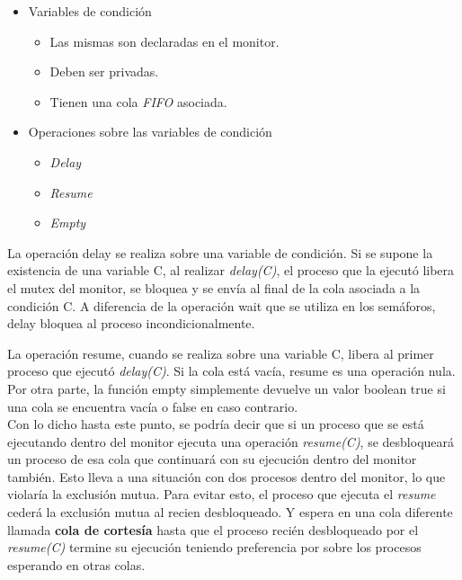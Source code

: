 \begin{itemize}
    \item Variables de condición
    \begin{itemize}
        \item Las mismas son declaradas en el monitor. 
        \item Deben ser privadas. 
        \item Tienen una cola \textit{FIFO} asociada.
    \end{itemize}
    \item Operaciones sobre las variables de condición
    \begin{itemize}
        \item \textit{Delay}
        \item \textit{Resume}
        \item \textit{Empty}
    \end{itemize}
\end{itemize}

La operación delay se realiza sobre una variable de condición. Si se supone la existencia de una variable C, al realizar \textit{delay(C)}, el proceso que la ejecutó libera el mutex del monitor, se bloquea y se envía al final de la cola asociada a la condición C. A diferencia de la operación wait que se utiliza en los semáforos, delay bloquea al proceso incondicionalmente.\\

\par La operación resume, cuando se realiza sobre una variable C, libera al primer proceso que ejecutó \textit{delay(C)}. Si la cola está vacía, resume es una operación nula. Por otra parte, la función empty simplemente devuelve un valor boolean true si una cola se encuentra vacía o false en caso contrario.\\

Con lo dicho hasta este punto, se podría decir que si un proceso que se está ejecutando dentro del monitor ejecuta una operación \textit{resume(C)}, se desbloqueará un proceso de esa cola que continuará con su ejecución dentro del monitor también. Esto lleva a una situación con dos procesos dentro del monitor, lo que violaría la exclusión mutua. Para evitar esto, el proceso que ejecuta el \textit{resume} cederá la exclusión mutua al recien desbloqueado. Y espera en una cola diferente llamada \textbf{cola de cortesía} hasta que el proceso recién desbloqueado por el \textit{resume(C)} termine su ejecución teniendo preferencia por sobre los procesos esperando en otras colas.


